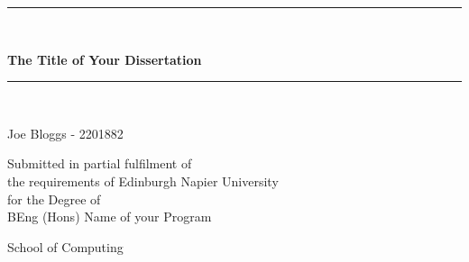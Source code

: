 \newcommand{\HRule}{\rule{\linewidth}{0.5mm}}

\begin{titlepage}
\begin{center}
\HRule \\[0.4cm]
    {\large \bfseries The Title of Your Dissertation\par}
\vspace{0.2cm}
\HRule \\[1.5cm]

\vspace{3cm}
\begin{minipage}{0.4\textwidth}
    \begin{center} \large
        Joe Bloggs - 2201882      
    \end{center}
\end{minipage}

\vspace{2cm}
\begin{minipage}{1\textwidth}
    \begin{center} \large
    Submitted in partial fulfilment of \\
    the requirements of Edinburgh Napier University \\
    for the Degree of \\
    BEng (Hons) Name of your Program
    \end{center}
\end{minipage}

\vfill

\begin{minipage}{1\textwidth}
    \begin{center} \large
    School of Computing
    \end{center}
\end{minipage}

\vspace{1cm}{\large \today}
\end{center}
\end{titlepage}
